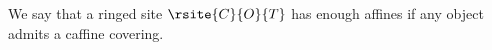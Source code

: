 \begin{definition}
We say that a ringed site $\rsite{C}{O}{T}$ has enough affines
if any object admits a caffine covering.
\end{definition}